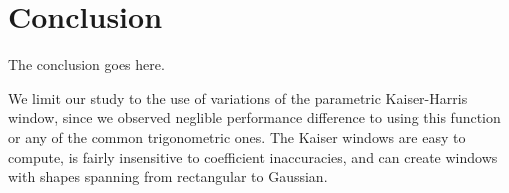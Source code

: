 \documentclass[10pt,journal,draftclsnofoot,onecolumn]{IEEEtran}
\let\MYoriglatexcaption\caption               %
\renewcommand{\caption}[2][\relax]{\MYoriglatexcaption[#2]{#2}}
\newcommand\1{\vec 1}
\begin{document}
%





\section{Conclusion}
The conclusion goes here.


We limit our study to the use of variations of the parametric Kaiser-Harris window, since we observed neglible performance difference to using this function or any of the common trigonometric ones. The Kaiser windows are easy to compute, is fairly insensitive to coefficient inaccuracies, and can create windows with shapes spanning from rectangular to Gaussian.




\end{document}
